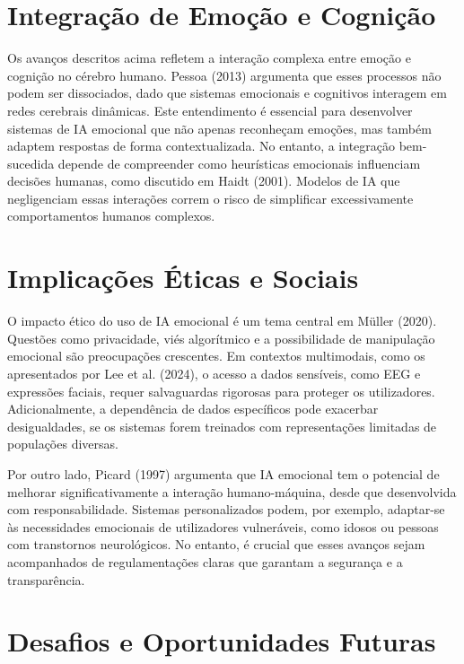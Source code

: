 \documentclass[a4paper,12pt]{report}
\begin{document}
	
	\section{Integração de Emoção e Cognição}
	
	Os avanços descritos acima refletem a interação complexa entre emoção e cognição no cérebro humano. Pessoa (2013) argumenta que esses processos não podem ser dissociados, dado que sistemas emocionais e cognitivos interagem em redes cerebrais dinâmicas. Este entendimento é essencial para desenvolver sistemas de IA emocional que não apenas reconheçam emoções, mas também adaptem respostas de forma contextualizada. No entanto, a integração bem-sucedida depende de compreender como heurísticas emocionais influenciam decisões humanas, como discutido em Haidt (2001). Modelos de IA que negligenciam essas interações correm o risco de simplificar excessivamente comportamentos humanos complexos.
	
	
	
	\section{Implicações Éticas e Sociais}
	
	O impacto ético do uso de IA emocional é um tema central em Müller (2020). Questões como privacidade, viés algorítmico e a possibilidade de manipulação emocional são preocupações crescentes. Em contextos multimodais, como os apresentados por Lee et al. (2024), o acesso a dados sensíveis, como EEG e expressões faciais, requer salvaguardas rigorosas para proteger os utilizadores. Adicionalmente, a dependência de dados específicos pode exacerbar desigualdades, se os sistemas forem treinados com representações limitadas de populações diversas.
	
	Por outro lado, Picard (1997) argumenta que IA emocional tem o potencial de melhorar significativamente a interação humano-máquina, desde que desenvolvida com responsabilidade. Sistemas personalizados podem, por exemplo, adaptar-se às necessidades emocionais de utilizadores vulneráveis, como idosos ou pessoas com transtornos neurológicos. No entanto, é crucial que esses avanços sejam acompanhados de regulamentações claras que garantam a segurança e a transparência.
	
	\section{Desafios e Oportunidades Futuras}
	
\end{document}
